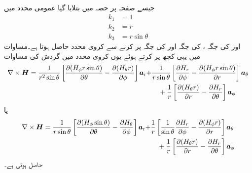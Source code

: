 جیسے صفحہ  پر حصہ  میں بتلایا گیا عمومی محدد میں
\begin{align*}
k_1&=1\\
k_2&=r\\
k_3&= r \sin \theta
\end{align*}
اور  کی جگہ ،  کی جگہ  اور  کی جگہ  پر کرنے سے کروی محدد حاصل ہوتا ہے۔مساوات  میں یہی کچھ پر کرتے ہوئے یوں کروی محدد میں گردش کی مساوات
\begin{align*}
\nabla \times {\ensuremath{{\boldsymbol{H}}}}=\frac{1}{r^2 \sin \theta}\left[\frac{\partial (H_\phi r \sin \theta)}{\partial \theta}-\frac{\partial (H_{\theta} r)}{\partial \phi} \right]{\boldsymbol{a}}_{\textup{r}}+&\frac{1}{r \sin \theta}\left[\frac{\partial H_r }{\partial \phi}-\frac{\partial (H_\phi  r \sin \theta)}{\partial r} \right]{\boldsymbol{a}}_{\theta}\\
&\quad +\frac{1}{r}\left[\frac{\partial (H_\theta r)}{\partial r}-\frac{\partial H_r }{\partial \theta} \right]{\boldsymbol{a}}_{\phi}
\end{align*}
یا
\begin{gather}
\begin{aligned}\label{مساوات_مقناطیسی_کروی_گردش}
\nabla \times {\ensuremath{{\boldsymbol{H}}}}=\frac{1}{r \sin \theta}\left[\frac{\partial (H_\phi  \sin \theta)}{\partial \theta}-\frac{\partial H_{\theta} }{\partial \phi} \right]{\boldsymbol{a}}_{\textup{r}}+&\frac{1}{r }\left[\frac{1}{\sin \theta}\frac{\partial H_r }{\partial \phi}-\frac{\partial (H_\phi  r )}{\partial r} \right]{\boldsymbol{a}}_{\theta}\\
&\quad +\frac{1}{r}\left[\frac{\partial (H_\theta r)}{\partial r}-\frac{\partial H_r }{\partial \theta} \right]{\boldsymbol{a}}_{\phi}
\end{aligned}
\end{gather}
حاصل ہوتی ہے۔

